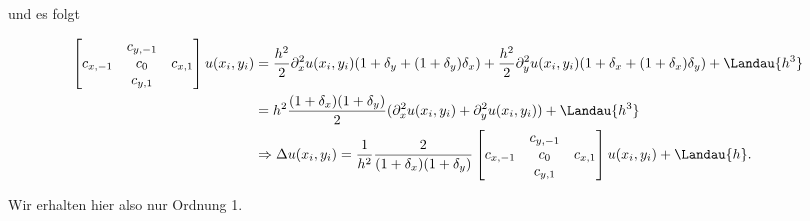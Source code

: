 \begin{solution}
  und es folgt

  \begin{align*}
  \begin{bmatrix}
  & c_{y,-1} &\\
  c_{x,-1} & c_0 & c_{x,1}\\
  & c_{y,1} &
\end{bmatrix}
  u(x_i,y_i) &= \frac{h^2}{2}\partial_x^2u(x_i,y_i)(1 + \delta_y + (1+\delta_y)\delta_x ) +\frac{h^2}{2}\partial_y^2 u(x_i,y_i)(1 + \delta_x + (1 + \delta_x)\delta_y) + \Landau{h^3} \\
  &= h^2 \frac{(1 + \delta_x)(1 + \delta_y)}{2} (\partial_x^2 u(x_i,y_i) + \partial_y^2 u(x_i,y_i)) + \Landau{h^3} \\
  &\Rightarrow \Delta u(x_i,y_i) = \frac{1}{h^2} \frac{2}{(1 + \delta_x)(1 + \delta_y)} \begin{bmatrix}
  & c_{y,-1} &\\
  c_{x,-1} & c_0 & c_{x,1}\\
  & c_{y,1} &
  \end{bmatrix} u(x_i,y_i) + \Landau{h}.
  \end{align*}

  Wir erhalten hier also nur Ordnung 1.
\end{solution}
